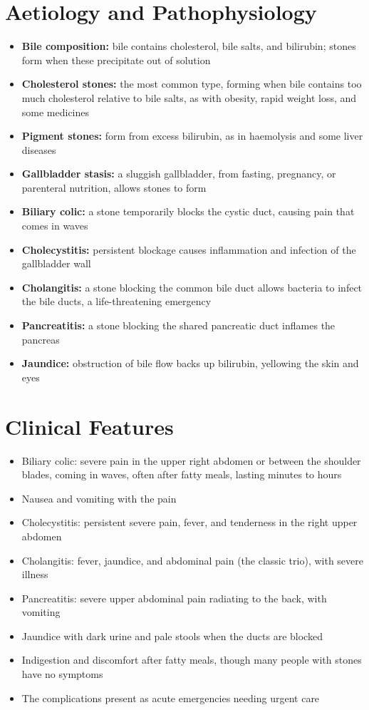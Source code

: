 \section*{Aetiology and Pathophysiology}
\begin{itemize}
    \item \textbf{Bile composition:} bile contains cholesterol, bile salts, and bilirubin; stones form when these precipitate out of solution
    \item \textbf{Cholesterol stones:} the most common type, forming when bile contains too much cholesterol relative to bile salts, as with obesity, rapid weight loss, and some medicines
    \item \textbf{Pigment stones:} form from excess bilirubin, as in haemolysis and some liver diseases
    \item \textbf{Gallbladder stasis:} a sluggish gallbladder, from fasting, pregnancy, or parenteral nutrition, allows stones to form
    \item \textbf{Biliary colic:} a stone temporarily blocks the cystic duct, causing pain that comes in waves
    \item \textbf{Cholecystitis:} persistent blockage causes inflammation and infection of the gallbladder wall
    \item \textbf{Cholangitis:} a stone blocking the common bile duct allows bacteria to infect the bile ducts, a life-threatening emergency
    \item \textbf{Pancreatitis:} a stone blocking the shared pancreatic duct inflames the pancreas
    \item \textbf{Jaundice:} obstruction of bile flow backs up bilirubin, yellowing the skin and eyes
\end{itemize}

\section*{Clinical Features}
\begin{itemize}
    \item Biliary colic: severe pain in the upper right abdomen or between the shoulder blades, coming in waves, often after fatty meals, lasting minutes to hours
    \item Nausea and vomiting with the pain
    \item Cholecystitis: persistent severe pain, fever, and tenderness in the right upper abdomen
    \item Cholangitis: fever, jaundice, and abdominal pain (the classic trio), with severe illness
    \item Pancreatitis: severe upper abdominal pain radiating to the back, with vomiting
    \item Jaundice with dark urine and pale stools when the ducts are blocked
    \item Indigestion and discomfort after fatty meals, though many people with stones have no symptoms
    \item The complications present as acute emergencies needing urgent care
\end{itemize}

